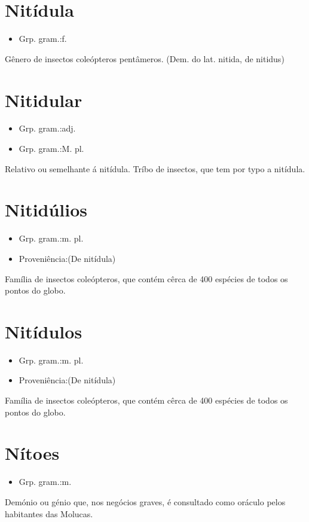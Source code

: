 \section{Nitídula}
\begin{itemize}
\item {Grp. gram.:f.}
\end{itemize}
Gênero de insectos coleópteros pentâmeros.
(Dem. do lat. \textunderscore nitida\textunderscore , de \textunderscore nitidus\textunderscore )
\section{Nitidular}
\begin{itemize}
\item {Grp. gram.:adj.}
\end{itemize}
\begin{itemize}
\item {Grp. gram.:M. pl.}
\end{itemize}
Relativo ou semelhante á \textunderscore nitídula\textunderscore .
Tríbo de insectos, que tem por typo a nitídula.
\section{Nitidúlios}
\begin{itemize}
\item {Grp. gram.:m. pl.}
\end{itemize}
\begin{itemize}
\item {Proveniência:(De \textunderscore nitídula\textunderscore )}
\end{itemize}
Família de insectos coleópteros, que contém cêrca de 400 espécies de todos os pontos do globo.
\section{Nitídulos}
\begin{itemize}
\item {Grp. gram.:m. pl.}
\end{itemize}
\begin{itemize}
\item {Proveniência:(De \textunderscore nitídula\textunderscore )}
\end{itemize}
Família de insectos coleópteros, que contém cêrca de 400 espécies de todos os pontos do globo.
\section{Nítoes}
\begin{itemize}
\item {Grp. gram.:m.}
\end{itemize}
Demónio ou génio que, nos negócios graves, é consultado como oráculo pelos habitantes das Molucas.
